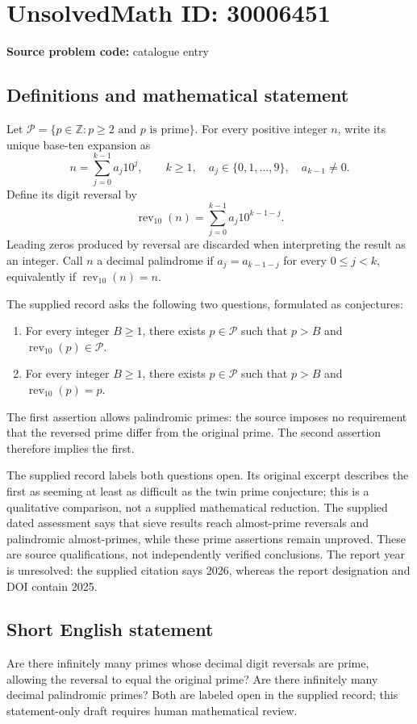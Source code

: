 \documentclass[11pt]{article}
\newcommand{\Z}{\mathbb{Z}}
\begin{document}
\section*{UnsolvedMath ID: 30006451}
\textbf{Source problem code:} catalogue entry
\subsection{Definitions and mathematical statement}
Let \(\mathcal P=\{p\in\Z:p\ge 2\text{ and }p\text{ is prime}\}\). For every positive integer \(n\), write its unique base-ten expansion as
\[
n=\sum_{j=0}^{k-1}a_j10^j,\qquad k\ge1,\quad a_j\in\{0,1,\ldots,9\},\quad a_{k-1}\ne0.
\]
Define its digit reversal by
\[
\operatorname{rev}_{10}(n)=\sum_{j=0}^{k-1}a_j10^{k-1-j}.
\]
Leading zeros produced by reversal are discarded when interpreting the result as an integer. Call \(n\) a decimal palindrome if \(a_j=a_{k-1-j}\) for every \(0\le j<k\), equivalently if \(\operatorname{rev}_{10}(n)=n\).

The supplied record asks the following two questions, formulated as conjectures:
\begin{enumerate}
\item For every integer \(B\ge1\), there exists \(p\in\mathcal P\) such that \(p>B\) and \(\operatorname{rev}_{10}(p)\in\mathcal P\).
\item For every integer \(B\ge1\), there exists \(p\in\mathcal P\) such that \(p>B\) and \(\operatorname{rev}_{10}(p)=p\).
\end{enumerate}
The first assertion allows palindromic primes: the source imposes no requirement that the reversed prime differ from the original prime. The second assertion therefore implies the first.

The supplied record labels both questions open. Its original excerpt describes the first as seeming at least as difficult as the twin prime conjecture; this is a qualitative comparison, not a supplied mathematical reduction. The supplied dated assessment says that sieve results reach almost-prime reversals and palindromic almost-primes, while these prime assertions remain unproved. These are source qualifications, not independently verified conclusions. The report year is unresolved: the supplied citation says 2026, whereas the report designation and DOI contain 2025.
\subsection{Short English statement}
Are there infinitely many primes whose decimal digit reversals are prime, allowing the reversal to equal the original prime? Are there infinitely many decimal palindromic primes? Both are labeled open in the supplied record; this statement-only draft requires human mathematical review.
\end{document}
